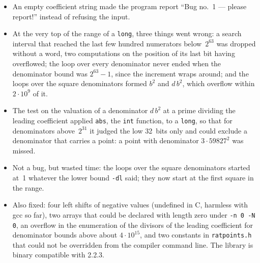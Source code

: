 \documentclass[12pt,a4paper,oneside]{amsart}
\begin{document}
\begin{itemize}
        passing \texttt{NULL} crashed instead of getting the error code back.
  \item An empty coefficient string made the program report
        ``Bug no.~1 --- please report!'' instead of refusing the input.
  \item At the very top of the range of a \texttt{long}, three things went
        wrong: a search interval that reached the last few hundred numerators
        below~$2^{63}$ was dropped without a word, two computations on the
        position of its last bit having overflowed; the loop over every
        denominator never ended when the denominator bound was $2^{63}-1$,
        since the increment wraps around; and the loops over the square
        denominators formed $b^2$ and $d\,b^2$, which overflow within
        $2\cdot10^9$ of it.
  \item The test on the valuation of a denominator $d\,b^2$ at a prime
        dividing the leading coefficient applied \texttt{abs}, the
        \texttt{int} function, to a \texttt{long}, so that for denominators
        above~$2^{31}$ it judged the low 32~bits only and could exclude a
        denominator that carries a point: a point with denominator
        $3\cdot 59827^2$ was missed.
  \item Not a bug, but wasted time: the loops over the square denominators
        started at~1 whatever the lower bound \verb+-dl+ said; they now start
        at the first square in the range.
  \item Also fixed: four left shifts of negative values
        (undefined in C, harmless with gcc so far), two arrays that could be
        declared with length zero under \verb+-n 0 -N 0+, an overflow in the
        enumeration of the divisors of the leading coefficient for denominator
        bounds above about $4\cdot10^{15}$, and two constants in
        \texttt{ratpoints.h} that could not be overridden from the compiler
        command line. The library is binary compatible with 2.2.3.
\end{itemize}
\end{document}
